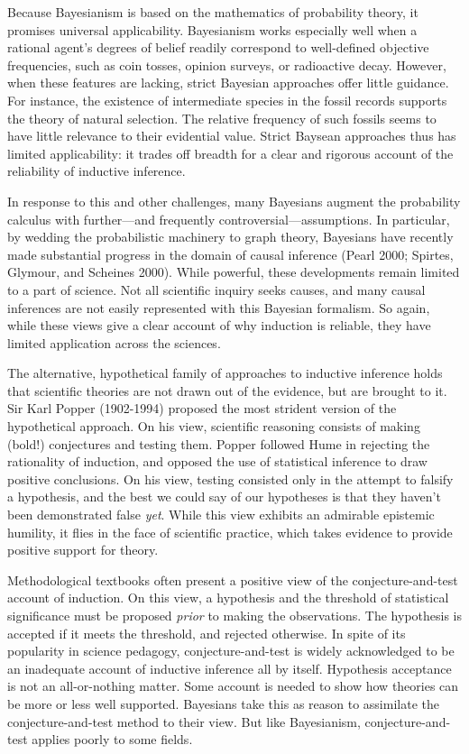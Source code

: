 \documentclass{article}[11pt]
\begin{document}
Because Bayesianism is based on the mathematics of probability theory, it promises universal applicability.  Bayesianism works especially well when a rational agent's degrees of belief readily correspond to well-defined objective frequencies, such as coin tosses, opinion surveys, or radioactive decay. However, when these features are lacking, strict Bayesian approaches offer little guidance. For instance, the existence of intermediate species in the fossil records supports the theory of natural selection.  The relative frequency of such fossils seems to have little relevance to their evidential value.  Strict Baysean approaches thus has limited applicability: it trades off breadth for a clear and rigorous account of the reliability of inductive inference.


In response to this and other challenges, many Bayesians augment the probability calculus with further---and frequently controversial---assumptions.  In particular, by wedding the probabilistic machinery to graph theory, Bayesians have recently made substantial progress in the domain of causal inference (Pearl 2000; Spirtes, Glymour, and Scheines 2000). While powerful, these developments remain limited to a part of science. Not all scientific inquiry seeks causes, and many causal inferences are not easily represented with this Bayesian formalism.  So again, while these views give a clear account of why induction is reliable, they have limited application across the sciences.

The alternative, hypothetical family of approaches to inductive inference holds that scientific theories are not drawn out of the evidence, but are brought to it. Sir Karl Popper (1902-1994) proposed the most strident version of the hypothetical approach.  On his view, scientific reasoning consists of making (bold!) conjectures and testing them.  Popper followed Hume in rejecting the rationality of induction, and opposed the use of statistical inference to draw positive conclusions.  On his view, testing consisted only in the attempt to falsify a hypothesis, and the best we could say of our hypotheses is that they haven't been demonstrated false \textit{yet}.  While this view exhibits an admirable epistemic humility, it flies in the face of scientific practice, which takes evidence to provide positive support for theory.

Methodological textbooks often present a positive view of the conjecture-and-test account of induction.  On this view, a hypothesis and the threshold of statistical significance must be proposed \textit{prior} to making the observations. The hypothesis is accepted if it meets the threshold, and rejected otherwise.  In spite of its popularity in science pedagogy, conjecture-and-test is widely acknowledged to be an inadequate account of inductive inference all by itself.  Hypothesis acceptance is not an all-or-nothing matter.  Some account is needed to show how theories can be more or less well supported. Bayesians take this as reason to assimilate the conjecture-and-test method to their view. But like Bayesianism, conjecture-and-test applies poorly to some fields.  
\end{document}

